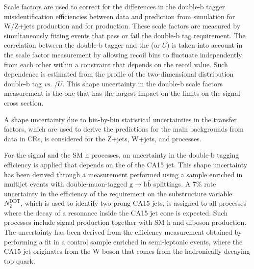 Scale factors are used to correct for the differences in the double-b tagger misidentification efficiencies between data and prediction from simulation for W/Z+jets production and for \ttbar production. These scale factors are measured by simultaneously fitting events that pass or fail the double-b tag requirement. The correlation between the double-b tagger and the \ptmiss (or $U$) is taken into account in the scale factor measurement by allowing recoil bins to fluctuate independently from each other within a constraint that depends on the recoil value. Such dependence is estimated from the profile of the two-dimensional distribution double-b tag {\it vs.\/} \ptmiss/$U$. This shape uncertainty in the double-b scale factors measurement is the one that has the largest impact on the limits on the signal cross section.

A shape uncertainty due to bin-by-bin statistical uncertainties in the transfer factors, which are used to derive the predictions for the main backgrounds from data in CRs, is considered for the Z+jets, W+jets, and \ttbar processes.

For the signal and the SM h processes, an uncertainty in the double-b tagging efficiency is applied that depends on the \pt of the CA15 jet. This shape uncertainty has been derived through a measurement performed using a sample enriched in multijet events with double-muon-tagged $\text{g}\to\text{b}\bar{\text{b}}$ splittings. A 7\% rate uncertainty in the efficiency of the requirement on the substructure variable $N_2^\text{DDT}$, which is used to identify two-prong CA15 jets, is assigned to all processes where the decay of a resonance inside the CA15 jet cone is expected. Such processes include signal production together with SM h and diboson production. The uncertainty has been derived from the efficiency measurement obtained by performing a fit in a control sample enriched in semi-leptonic \ttbar events, where the CA15 jet originates from the W boson that comes from the hadronically decaying top quark. 



